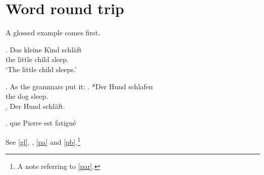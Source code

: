 \documentclass{article}
\begin{document}
\section{Word round trip}

A glossed example comes first.

\ex.\label{gl} \gll Das {kleine Kind} schl\"aft \\
     the {little child} sleep. \\
\glt `The little child sleeps.'

\ex.\label{par} As the grammars put it:
\a.\label{pa} *\gll Der Hund schlafen \\
     the dog sleep. \\
\b.\label{pb} Der Hund schl\"aft.

\ex. que Pierre est fatigu\'e\exannot{[CP]}

See \ref{gl}, , \ref{pa} and \ref{pb}.\footnote{A note referring to \ref{par}.}
\end{document}
